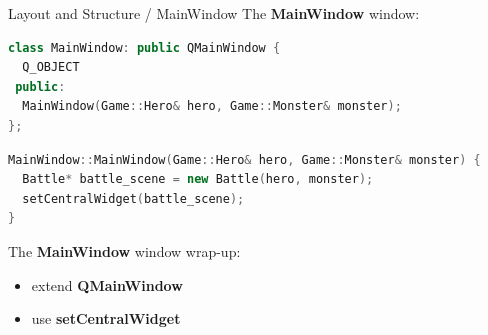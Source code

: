 \documentclass[11pt]{beamer}
\renewcommand{\emph}[1]{\textbf{#1}}
\begin{document}
\begin{frame}[fragile]{Layout and Structure / MainWindow}
 The \emph{MainWindow} window:
 \begin{lstlisting}[language=C++]
class MainWindow: public QMainWindow {
  Q_OBJECT
 public:
  MainWindow(Game::Hero& hero, Game::Monster& monster);
};
\end{lstlisting}
 \begin{lstlisting}[language=C++]
MainWindow::MainWindow(Game::Hero& hero, Game::Monster& monster) {
  Battle* battle_scene = new Battle(hero, monster);
  setCentralWidget(battle_scene);
}
\end{lstlisting}

 The \emph{MainWindow} window wrap-up:
 \begin{itemize}
  \item extend \emph{QMainWindow}
  \item use \emph{setCentralWidget}
 \end{itemize}
\end{frame}
\end{document}
